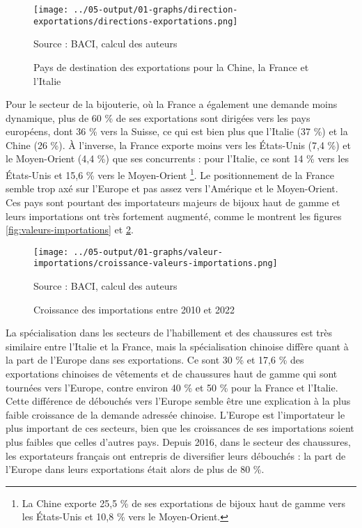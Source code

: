 \documentclass[french,10pt,a4paper]{article}
\begin{document}
\begin{figure}[!h]
  \centering
  \texttt{[image: ../05-output/01-graphs/direction-exportations/directions-exportations.png]}
  \captionsetup{justification=raggedright,singlelinecheck=false, font=small}
  \caption*{Source : BACI, calcul des auteurs}
  \captionsetup{justification=centering, singlelinecheck=true, font=normalsize}
  \caption{Pays de destination des exportations pour la Chine, la France et l'Italie}
  \label{fig:direction-exportations}
\end{figure}

Pour le secteur de la bijouterie, où la France a également une demande moins dynamique, plus de 60 \% de ses exportations sont dirigées vers les pays européens, dont 36 \% vers la Suisse, ce qui est bien plus que l'Italie (37 \%) et la Chine (26 \%). À l'inverse, la France exporte moins vers les États-Unis (7,4 \%) et le Moyen-Orient (4,4 \%) que ses concurrents : pour l'Italie, ce sont 14 \% vers les États-Unis et 15,6 \% vers le Moyen-Orient \footnote{La Chine exporte 25,5 \% de ses exportations de bijoux haut de gamme vers les États-Unis et 10,8 \% vers le Moyen-Orient.}. Le positionnement de la France semble trop axé sur l'Europe et pas assez vers l'Amérique et le Moyen-Orient. Ces pays sont pourtant des importateurs majeurs de bijoux haut de gamme et leurs importations ont très fortement augmenté, comme le montrent les figures \ref{fig:valeurs-importations} et \ref{fig:croissance-valeurs-importations}.

\begin{figure}[!h]
  \centering
  \texttt{[image: ../05-output/01-graphs/valeur-importations/croissance-valeurs-importations.png]}
  \captionsetup{justification=raggedright,singlelinecheck=false, font=small}
  \caption*{Source : BACI, calcul des auteurs}
  \captionsetup{justification=centering, singlelinecheck=true, font=normalsize}
  \caption{Croissance des importations entre 2010 et 2022}
  \label{fig:croissance-valeurs-importations}
\end{figure}

La spécialisation dans les secteurs de l'habillement et des chaussures est très similaire entre l'Italie et la France, mais la spécialisation chinoise diffère quant à la part de l'Europe dans ses exportations. Ce sont 30 \% et 17,6 \% des exportations chinoises de vêtements et de chaussures haut de gamme qui sont tournées vers l'Europe, contre environ 40 \% et 50 \% pour la France et l’Italie. Cette différence de débouchés vers l'Europe semble être une explication à la plus faible croissance de la demande adressée chinoise. L'Europe est l'importateur le plus important de ces secteurs, bien que les croissances de ses importations soient plus faibles que celles d'autres pays. Depuis 2016, dans le secteur des chaussures, les exportateurs français ont entrepris de diversifier leurs débouchés : la part de l'Europe dans leurs exportations était alors de plus de 80 \%.
\end{document}
